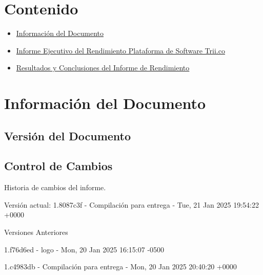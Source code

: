 \documentclass[
  paper=a4,
  ,captions=tableheading
]{scrartcl}
\providecommand{\tightlist}{%
  \setlength{\itemsep}{0pt}\setlength{\parskip}{0pt}}
\renewenvironment{quote}{\begin{customblockquote}\list{}{\rightmargin=0em\leftmargin=0em}%
\item\relax\color{blockquote-text}\ignorespaces}{\unskip\unskip\endlist\end{customblockquote}}
\begin{document}



\section{Contenido}\label{sec:contenido}

\begin{itemize}
\tightlist
\item
  \hyperref[informaciuxf3n-del-documento]{Información del Documento}
\item
  \hyperref[informe-ejecutivo-del-rendimiento-plataforma-de-software-trii.co]{Informe
  Ejecutivo del Rendimiento Plataforma de Software Trii.co}
\item
  \hyperref[resultados-y-conclusiones-del-informe-de-rendimiento]{Resultados
  y Conclusiones del Informe de Rendimiento}
\end{itemize}

\newpage

\section{Información del
Documento}\label{sec:informaciuxf3n-del-documento}

\subsection{Versión del Documento}\label{sec:versiuxf3n-del-documento}

\begin{quote}
\end{quote}

\subsection{Control de Cambios}\label{sec:control-de-cambios}

Historia de cambios del informe.

Versión actual: 1.8087c3f - Compilación para entrega - Tue, 21 Jan 2025
19:54:22 +0000

Versiones Anteriores

1.f76d6ed - logo - Mon, 20 Jan 2025 16:15:07 -0500

1.c4983db - Compilación para entrega - Mon, 20 Jan 2025 20:40:20 +0000
\end{document}
